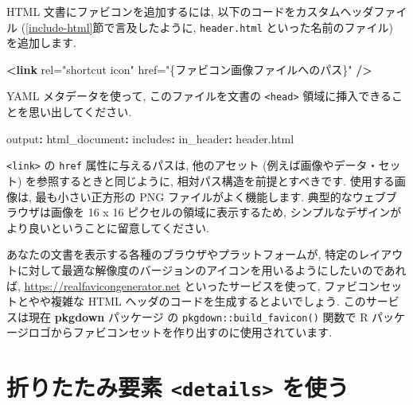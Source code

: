 \documentclass[
  11pt,
  lualatex,ja=standard,jafont=noto]{bxjsreport}
\newenvironment{Shaded}{\begin{snugshade}}{\end{snugshade}}
\newcommand{\AttributeTok}[1]{\textcolor[rgb]{0.77,0.63,0.00}{#1}}
\newcommand{\FunctionTok}[1]{\textcolor[rgb]{0.00,0.00,0.00}{#1}}
\newcommand{\KeywordTok}[1]{\textcolor[rgb]{0.13,0.29,0.53}{\textbf{#1}}}
\newcommand{\OtherTok}[1]{\textcolor[rgb]{0.56,0.35,0.01}{#1}}
\newcommand{\StringTok}[1]{\textcolor[rgb]{0.31,0.60,0.02}{#1}}
\begin{document}
HTML 文書にファビコンを追加するには, 以下のコードをカスタムヘッダファイル (\ref{include-html}節で言及したように, \texttt{header.html} といった名前のファイル) を追加します.

\begin{Shaded}
\begin{Highlighting}[]
\KeywordTok{\textless{}link}\OtherTok{ rel=}\StringTok{"shortcut icon"}\OtherTok{ href=}\StringTok{"\{ファビコン画像ファイルへのパス\}"} \KeywordTok{/\textgreater{}}
\end{Highlighting}
\end{Shaded}

YAML メタデータを使って, このファイルを文書の \texttt{\textless{}head\textgreater{}} 領域に挿入できることを思い出してください.

\begin{Shaded}
\begin{Highlighting}[]
\FunctionTok{output}\KeywordTok{:}
\AttributeTok{  }\FunctionTok{html\_document}\KeywordTok{:}
\AttributeTok{    }\FunctionTok{includes}\KeywordTok{:}
\AttributeTok{      }\FunctionTok{in\_header}\KeywordTok{:}\AttributeTok{ header.html}
\end{Highlighting}
\end{Shaded}

\texttt{\textless{}link\textgreater{}} の \texttt{href} 属性に与えるパスは, 他のアセット (例えば画像やデータ・セット) を参照するときと同じように, 相対パス構造を前提とすべきです. 使用する画像は, 最も小さい正方形の PNG ファイルがよく機能します. 典型的なウェブブラウザは画像を 16 x 16 ピクセルの領域に表示するため, シンプルなデザインがより良いということに留意してください.

あなたの文書を表示する各種のブラウザやプラットフォームが, 特定のレイアウトに対して最適な解像度のバージョンのアイコンを用いるようにしたいのであれば, \url{https://realfavicongenerator.net} といったサービスを使って, ファビコンセットとやや複雑な HTML ヘッダのコードを生成するとよいでしょう. このサービスは現在 \textbf{pkgdown} パッケージ \autocite{R-pkgdown} の \texttt{pkgdown::build\_favicon()} 関数で R パッケージロゴからファビコンセットを作り出すのに使用されています.

\hypertarget{details-tag}{%
\section{\texorpdfstring{折りたたみ要素 \texttt{\textless{}details\textgreater{}} を使う}{折りたたみ要素 \textless details\textgreater{} を使う}}\label{details-tag}}
\end{document}
